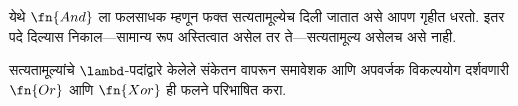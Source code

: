 \documentclass[../../../include/open-logic-section]{subfiles}
\begin{document}
येथे $\fn{And}$ ला फलसाधक म्हणून फक्त
सत्यतामूल्येच दिली जातात असे आपण गृहीत धरतो.
इतर पदे दिल्यास निकाल—सामान्य रूप अस्तित्वात
असेल तर ते—सत्यतामूल्य असेलच असे नाही.

\begin{prob}
  सत्यतामूल्यांचे $\lambd$-पदांद्वारे केलेले संकेतन
  वापरून समावेशक आणि अपवर्जक विकल्पयोग दर्शवणारी
  $\fn{Or}$ आणि $\fn{Xor}$ ही फलने परिभाषित करा.
\end{prob}
\end{document}
